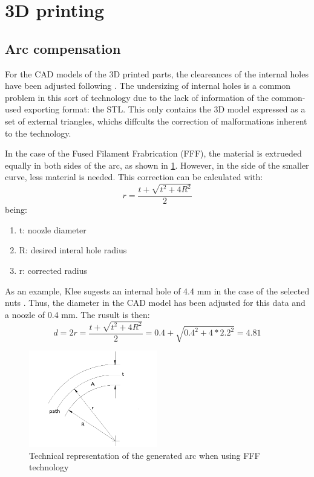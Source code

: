 \section{3D printing} %
\label{sec:3d_printing}

  \subsection{Arc compensation} %
  \label{sub:arc_compensation}
  For the CAD models of the 3D printed parts, the cleareances of the internal holes have been adjusted following \cite{arc_compensation}.
  The undersizing of internal holes is a common problem in this sort of technology due to the lack of information of the common-used exporting format: the STL.
  This only contains the 3D model expressed as a set of external triangles, whichs diffcults the correction of malformations inherent to the technology.

  In the case of the Fused Filament Frabrication (FFF), the material is extrueded equally in both sides of the arc, as shown in \ref{fig:arc_compensation}. 
  However, in the side of the smaller curve, less material is needed.
  This correction can be calculated with:
  $$ r=\frac{t+\sqrt{t^2+4R^2}}{2}$$
  being:
  \begin{enumerate}
    \item t: noozle diameter
    \item R: desired interal hole radius
    \item r: corrected radius
  \end{enumerate}
  As an example, Klee sugests an internal hole of 4.4 mm in the case of the selected nuts \cite{klee}. Thus, the diameter in the CAD model has been adjusted for this data and a noozle of 0.4 mm. The rusult is then:
  $$ d=2r=\frac{t+\sqrt{t^2+4R^2}}{2}=0.4+\sqrt{0.4^2+4*2.2^2}=4.81$$

  \begin{figure}[tb]
    \centering
    \includegraphics[width=0.5\textwidth]{figures/Arc-compensation}
    \caption{Technical representation of the generated arc when using FFF technology}
    \label{fig:arc_compensation}
  \end{figure}

